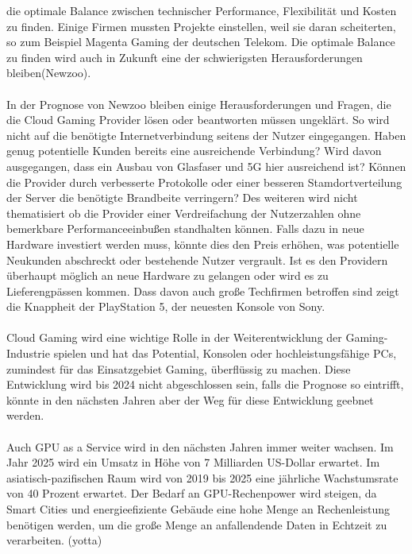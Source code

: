 \documentclass[12pt,toc=bib,toc=listof]{scrreprt}
\begin{document}
die optimale Balance zwischen technischer Performance, Flexibilität und Kosten zu finden. Einige Firmen mussten Projekte einstellen, weil 
sie daran scheiterten, so zum Beispiel Magenta Gaming der deutschen Telekom. Die optimale Balance zu finden wird auch in Zukunft eine
der schwierigsten Herausforderungen bleiben(Newzoo). 
\\ \\
In der Prognose von Newzoo bleiben einige Herausforderungen und Fragen, die die Cloud Gaming Provider lösen 
oder beantworten müssen ungeklärt. So wird nicht auf die benötigte Internetverbindung seitens der Nutzer eingegangen.
Haben genug potentielle Kunden bereits eine ausreichende Verbindung? Wird davon ausgegangen, dass ein Ausbau von Glasfaser 
und 5G hier ausreichend ist? Können die Provider durch verbesserte Protokolle oder einer besseren Stamdortverteilung 
der Server die benötigte Brandbeite verringern? Des weiteren wird nicht thematisiert ob die Provider einer Verdreifachung 
der Nutzerzahlen ohne bemerkbare Performanceeinbußen standhalten können. Falls dazu in neue Hardware investiert werden muss, 
könnte dies den Preis erhöhen, was potentielle Neukunden abschreckt oder bestehende Nutzer vergrault. Ist es den Providern 
überhaupt möglich an neue Hardware zu gelangen oder wird es zu Lieferengpässen kommen. Dass davon auch große Techfirmen
betroffen sind zeigt die Knappheit der PlayStation 5, der neuesten Konsole von Sony.
\\ \\
Cloud Gaming wird eine wichtige Rolle in der Weiterentwicklung der Gaming-Industrie spielen und hat das Potential, 
Konsolen oder hochleistungsfähige PCs, zumindest für das Einsatzgebiet Gaming, überflüssig zu machen. Diese Entwicklung 
wird bis 2024 nicht abgeschlossen sein, falls die Prognose so eintrifft, könnte in den nächsten Jahren aber der Weg 
für diese Entwicklung geebnet werden.
\\ \\
Auch GPU as a Service wird in den nächsten Jahren immer weiter wachsen. Im Jahr 2025 wird ein Umsatz in Höhe von 7 Milliarden US-Dollar erwartet. 
Im asiatisch-pazifischen Raum wird von 2019 bis 2025 eine jährliche Wachstumsrate von 40 Prozent erwartet. Der Bedarf an GPU-Rechenpower wird steigen, 
da Smart Cities und energieefiziente Gebäude eine hohe Menge an Rechenleistung benötigen werden, um die große Menge an anfallendende Daten in Echtzeit
zu verarbeiten. (yotta)
\end{document}
